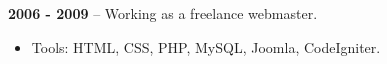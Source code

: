 \documentclass[10pt]{article}
\renewcommand{\section}[2]%
        {\pagebreak[2]\vspace{1.3\baselineskip}%
         \phantomsection\addcontentsline{toc}{section}{#1}%
         \hspace{0in}%
         \marginpar{
         \raggedright \scshape #1}#2}
\begin{document}
\textbf{2006 - 2009} -- Working as a freelance webmaster.
\begin{itemize}
  \item Tools: HTML, CSS, PHP, MySQL, Joomla, CodeIgniter.%
\end{itemize}











\end{document}
